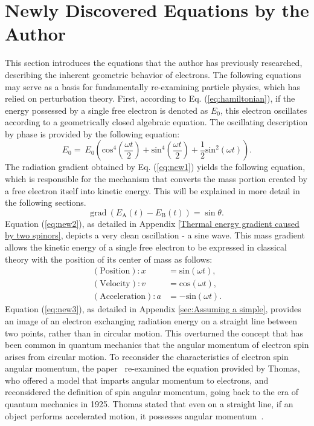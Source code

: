 \documentclass[%
 reprint,
 amsmath,amssymb,
 aps,
]{revtex4-1}
\numberwithin{equation}{section}%
\begin{document}
\section{\label{sec:Newly Discovered Equations}Newly Discovered Equations by the Author}
This section introduces the equations that the author has previously researched, describing the inherent geometric behavior of electrons. The following equations may serve as a basis for fundamentally re-examining particle physics, which has relied on perturbation theory.
First, according to Eq. (\ref{eq:hamiltonian}), if the energy possessed by a single free electron is denoted as $E_{0}$, this electron oscillates according to a geometrically closed algebraic equation. The oscillating description by phase is provided by the following equation:
\begin{equation}
E_{0} = \ E_{0} \left( \mathrm{cos}^{4} \left( \frac{\omega t}{2} \right) + \mathrm{sin}^{4} \left( \frac{\omega t}{2} \right) + \frac{1}{2} \mathrm{sin}^{2} (\omega t) \right).
\label{eq:new1}
\end{equation}
The radiation gradient obtained by Eq. (\ref{eq:new1}) yields the following equation, which is responsible for the mechanism that converts the mass portion created by a free electron itself into kinetic energy. This will be explained in more detail in the following sections.
\begin{equation}
\mathrm{grad} \ (E_{\mathrm{A}}(t) - E_{\mathrm{B}}(t)) = \sin \theta.
\label{eq:new2}
\end{equation}
Equation (\ref{eq:new2}), as detailed in Appendix \ref{Thermal energy gradient caused by two spinors},  depicts a very clean oscillation - a sine wave. This mass gradient allows the kinetic energy of a single free electron to be expressed in classical theory with the position of its center of mass as follows:
\begin{equation}
    \begin{split}
    (\mathrm{Position}):  x
    &= \mathrm{sin}(\omega t) , \\
    (\mathrm{Velocity}): v
    &= \mathrm{cos}(\omega t) , \\
    (\mathrm{Acceleration}): a
    &= - \mathrm{sin}(\omega t)
    .
    \label{eq:new3}
    \end{split}
\end{equation}
Equation (\ref{eq:new3}), as detailed in Appendix \ref{sec:Assuming a simple},  provides an image of an electron exchanging radiation energy on a straight line between two points, rather than in circular motion. This overturned the concept that has been common in quantum mechanics that the angular momentum of electron spin arises from circular motion. To reconsider the characteristics of electron spin angular momentum, the paper~\cite{hanamura2023} re-examined the equation provided by Thomas, who offered a model that imparts angular momentum to electrons, and reconsidered the definition of spin angular momentum, going back to the era of quantum mechanics in 1925. Thomas stated that even on a straight line, if an object performs accelerated motion, it possesses angular momentum~\cite{Thomas}.
\end{document}
